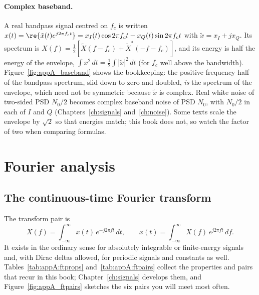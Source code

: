 \paragraph{Complex baseband.} A real bandpass signal centred on $f_c$ is written
$x(t)=\re\{\tilde x(t)e^{j2\pi f_c t}\}=x_I(t)\cos 2\pi f_c t-x_Q(t)\sin 2\pi f_c t$ with
$\tilde x=x_I+jx_Q$. Its spectrum is $X(f)=\tfrac12[\tilde X(f-f_c)+\tilde X^*(-f-f_c)]$, and its
energy is half the energy of the envelope, $\int x^2\,dt=\tfrac12\int|\tilde x|^2\,dt$ (for
$f_c$ well above the bandwidth). Figure~\ref{fig:appA_baseband} shows the bookkeeping: the
positive-frequency half of the bandpass spectrum, slid down to zero and doubled, \emph{is} the
spectrum of the envelope, which need not be symmetric because $\tilde x$ is complex. Real white
noise of two-sided PSD $N_0/2$ becomes complex baseband noise of PSD $N_0$, with $N_0/2$ in each of
$I$ and $Q$ (Chapters~\ref{ch:signals} and~\ref{ch:noise}). Some texts scale the envelope by
$\sqrt2$ so that energies match; this book does not, so watch the factor of two when comparing
formulas.


\section{Fourier analysis}
\label{sec:appA:fourier}

\subsection{The continuous-time Fourier transform}

The transform pair is
\begin{equation}
X(f)=\int_{-\infty}^{\infty}x(t)\,e^{-j2\pi ft}\,dt,\qquad
x(t)=\int_{-\infty}^{\infty}X(f)\,e^{j2\pi ft}\,df.
\label{eq:appA:ft}
\end{equation}
It exists in the ordinary sense for absolutely integrable or finite-energy signals and, with
Dirac deltas allowed, for periodic signals and constants as well. Tables~\ref{tab:appA:ftprops}
and~\ref{tab:appA:ftpairs} collect the properties and pairs that recur in this book;
Chapter~\ref{ch:signals} develops them, and Figure~\ref{fig:appA_ftpairs} sketches the six pairs
you will meet most often.

